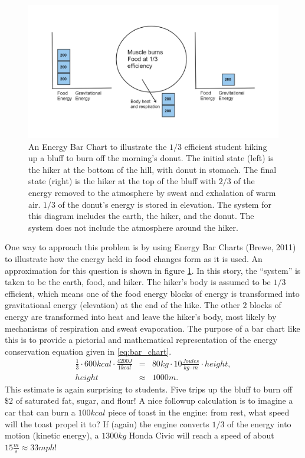 \documentclass[11pt,letter]{article}
\newcommand{\bea}{\begin{eqnarray}}
\newcommand{\eea}{\end{eqnarray}}
\begin{document}
\begin{figure}[h]
\centering
\includegraphics[width=\columnwidth]{bar_chart.png}
\caption{An Energy Bar Chart to illustrate the $1/3$ efficient student hiking up a bluff to burn off the morning's donut.  The initial state (left) is the hiker at the bottom of the hill, with donut in stomach.  The final state (right) is the hiker at the top of the bluff with $2/3$ of the energy removed to the atmosphere by sweat and exhalation of warm air. $1/3$ of the donut's energy is stored in elevation.  The system for this diagram includes the earth, the hiker, and the donut.  The system does not include the atmosphere around the hiker.  
}
\label{bar_chart}
\end{figure}

One way to approach this problem is by using Energy Bar Charts (Brewe, 2011) to illustrate how the energy held in food changes form as it is used.  An approximation for this question is shown in figure \ref{bar_chart}.  
In this story, the ``system'' is taken to be the earth, food, and hiker.  The hiker's body is assumed to be $1/3$ efficient, which means one of the food energy blocks of energy is transformed into gravitational energy (elevation) at the end of the hike.  
The other $2$ blocks of energy are transformed into heat and leave the hiker's body, most likely by mechanisms of respiration and sweat evaporation. The purpose of a bar chart like this is to provide a pictorial and mathematical representation of the energy conservation equation given in \ref{eq:bar_chart}.         
\bea
\frac{1}{3}\cdot600kcal\cdot\frac{4200J}{1kcal} 
	&=& 80kg\cdot10\frac{Joules}{kg\cdot m}\cdot height , \label{eq:bar_chart}\\
height &\approx&  1000 m .
\eea
This estimate is again surprising to students.  Five trips up the bluff to burn off $\$2$ of saturated fat, sugar, and flour!  A nice followup calculation is to imagine a car that can burn a $100kcal$ piece of toast in the engine: from rest, what speed will the toast propel it to? If (again) the engine converts $1/3$ of the energy into motion (kinetic energy), a $1300kg$ Honda Civic will reach a speed of about $15\frac{m}{s}\approx33mph$!  
\end{document}
